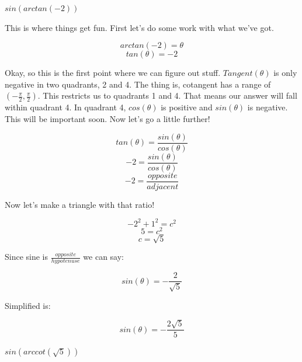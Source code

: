 \documentclass[10pt,letterpaper]{amspset}
\begin{document}
\pagebreak


\begin{problem}[133]
    $sin(arctan(-2))$
\end{problem}

\begin{solution}
    This is where things get fun. First let's do some work with what we've got. 
    
    \[ arctan(-2) = \theta\]
    \[ tan(\theta) = -2 \]
    
    Okay, so this is the first point where we can figure out stuff. $Tangent(\theta)$ is only negative in two quadrants, 2 and 4. The thing is, cotangent has a range of $(-\frac{\pi}{2}, \frac{\pi}{2})$. This restricts us to quadrants 1 and 4. That means our answer will fall within quadrant 4. In quadrant 4, $cos(\theta)$ is positive and $sin(\theta)$ is negative. This will be important soon. Now let's go a little further! 
    
    \[ tan(\theta) = \frac{sin(\theta)}{cos(\theta)}\]
    \[ -2 = \frac{sin(\theta)}{cos(\theta)}\]
    \[ -2 = \frac{opposite}{adjacent} \]
    
    Now let's make a triangle with that ratio! 
    

    \[ -2^2 + 1^2 = c^2\]
    \[ 5 = c^2\]
    \[ c = \sqrt{5}\]

    Since sine is $\frac{opposite}{hypotenuse}$ we can say:

    \[ sin(\theta) = -\frac{2}{\sqrt{5}}\]
    
    Simplified is: 

    \[\boxed{ sin(\theta) = -\frac{2\sqrt{5}}{5} }\]
\end{solution}


\pagebreak


\begin{problem}[134]
    $sin(arccot(\sqrt{5}))$
\end{problem}
\end{document}
